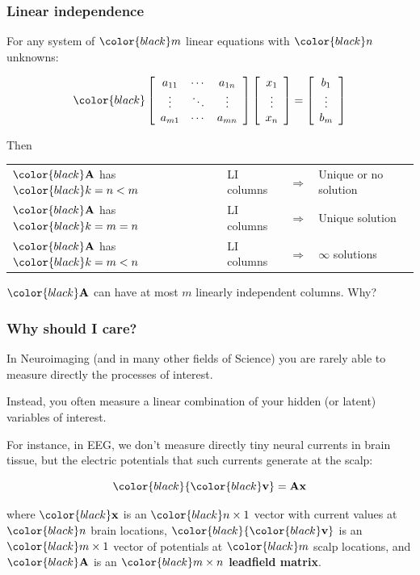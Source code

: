 \documentclass[compress]{beamer}
\newcommand{\black}[1]{{\color{black}#1}}
\renewcommand{\emph}[1]{\textbf{\black{#1}}}
\newcommand{\beq}[1]{\[\black{#1}\]}
\renewcommand{\v}{\black{\mathbf{v}}}
\begin{document}
\begin{frame}
\frametitle{Linear independence}
For any system of $\black{m}$ linear equations with $\black{n}$ unknowns:

\beq{
\left[ 
\begin{array}{ccc}
a_{11} & \cdots & a_{1n}\\
\vdots & \ddots & \vdots\\
a_{m1} &\cdots & a_{mn}
\end{array}
\right]\left[
\begin{array}{c}
x_1\\
\vdots\\
x_n
\end{array}
\right] = 
\left[
\begin{array}{c}
b_1\\
\vdots\\
b_m
\end{array}
\right]
}

\vspace{.5cm}
Then

\vspace{.5cm}

\begin{tabular}{llcl}
$\black{\A}$ has $\black{k = n < m}$ & LI columns & $\Rightarrow$ & Unique or no solution\\
$\black{\A}$ has $\black{k = m = n}$ & LI columns & $\Rightarrow$ & Unique solution\\
$\black{\A}$ has $\black{k = m < n}$ & LI columns & $\Rightarrow$ & $\infty$ solutions
\end{tabular}

\vspace{.5cm}

$\black{\A}$ can have at most $m$ linearly independent columns. Why?

\end{frame}



\begin{frame}
\frametitle{Why should I care?}

In Neuroimaging (and in many other fields of Science) you are rarely able to measure directly the processes of interest.

\vspace{.5cm}
Instead, you often measure a linear combination of your hidden (or latent) variables of interest. 

\vspace{.5cm}
For instance, in EEG, we don't measure directly tiny neural currents in brain tissue, but the electric potentials that such currents generate at the scalp:

\beq{
\v = \A\x
}


where $\black{\x}$ is an $\black{n\times 1}$ vector with current values at $\black{n}$ brain locations, $\black{\v}$ is an $\black{m\times 1}$ vector of potentials at $\black{m}$ scalp locations, and $\black{\A}$ is an $\black{m\times n}$ \emph{leadfield matrix}.


\end{frame}
\end{document}
